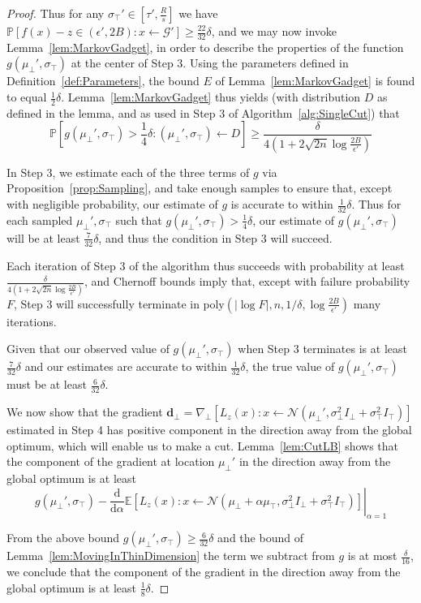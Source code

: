 \documentclass[11pt,letter]{article}
\renewcommand{\Pr}{\mathbb{P}}
\newcommand{\Exp}{\mathbb{E}}
\newcommand{\from}{\leftarrow}
\renewcommand{\poly}{\mathrm{poly}}
\newcommand{\Normal}{\mathcal{N}}
\renewcommand{\vec}[1]{\mathbf{#1}}
\renewcommand{\d}{\mathrm{d}}
\newcommand{\Diff}[2][]{\frac{\d#1}{\d#2}}
\newcommand{\Grad}{\nabla}
\newcommand{\ferr}{\epsilon}
\newcommand{\perr}{\delta}
\newcommand{\safety}{s}
\numberwithin{nTheorems}{section}
\begin{document}
\begin{proof}
Thus for any $\sigma_\top'\in [\tau',\frac{R}{\safety}]$ we have $\Pr[f(x)-z \in (\ferr',2B):x\from\mathcal{G}']\geq\frac{22}{32}\perr$, and
we may now invoke Lemma~\ref{lem:MarkovGadget}, in order to describe the properties of the function $g(\mu_\bot',\sigma_\top)$ at the center of Step 3. Using the parameters defined in Definition~\ref{def:Parameters}, the bound $E$ of Lemma~\ref{lem:MarkovGadget} is found to equal $\frac{1}{2}\perr$. Lemma~\ref{lem:MarkovGadget} thus yields (with distribution $D$ as defined in the lemma, and as used in Step 3 of Algorithm~\ref{alg:SingleCut}) that $$\Pr[g(\mu_\bot', \sigma_\top) > \frac{1}{4}\perr : (\mu_\bot', \sigma_\top) \from D] \ge \frac{\perr}{4(1+2\sqrt{2n}\log\frac{2B}{\epsilon'})}$$

In Step 3, we estimate each of the three terms of $g$ via Proposition~\ref{prop:Sampling}, and take enough samples to ensure that, except with negligible probability, our estimate of $g$ is accurate to within $\frac{1}{32}\perr$. Thus for each sampled $\mu_\bot', \sigma_\top$ such that $g(\mu_\bot', \sigma_\top) > \frac{1}{4}\perr$, our estimate of $g(\mu_\bot', \sigma_\top)$ will be at least $\frac{7}{32}\perr$, and thus the condition in Step 3 will succeed.

Each iteration of Step 3 of the algorithm thus succeeds with probability at least $\frac{\perr}{4(1+2\sqrt{2n}\log\frac{2B}{\epsilon'})}$, and Chernoff bounds imply that, except with failure probability $F$, Step 3 will successfully terminate in $\poly(|\log F|,n,1/\perr,\log\frac{2B}{\ferr'})$ many iterations.

Given that our observed value of $g(\mu_\bot', \sigma_\top)$ when Step 3 terminates is at least $\frac{7}{32}\perr$ and our estimates are accurate to within $\frac{1}{32}\perr$, the true value of $g(\mu_\bot', \sigma_\top)$ must be at least $\frac{6}{32}\perr$.

We now show that the gradient $\vec{d}_\bot = \Grad_\bot[L_z(x) : x \from \Normal(\mu_\bot', \sigma_\bot^2 I_\bot + \sigma_\top^2 I_\top)]$ estimated in Step 4 has positive component in the direction away from the global optimum, which will enable us to make a cut. Lemma~\ref{lem:CutLB} shows that the component of the gradient at location $\mu_\bot'$ in the direction away from the global optimum is at least \[g(\mu_\bot', \sigma_\top)-\left.\Diff{\alpha} \Exp\left[L_z(x) : x \from \Normal(\mu_\bot +\alpha \mu_\top, \sigma_\bot^2 I_\bot + \sigma_\top^2 I_\top) \right]\right|_{\alpha = 1}\]

From the above bound $g(\mu_\bot', \sigma_\top)\geq\frac{6}{32}\perr$ and the bound of Lemma~\ref{lem:MovingInThinDimension} the term we subtract from $g$ is at most $\frac{\perr}{16}$, we conclude that the component of the gradient in the direction away from the global optimum is at least $\frac{1}{8}\perr$.


\end{proof}
\end{document}
